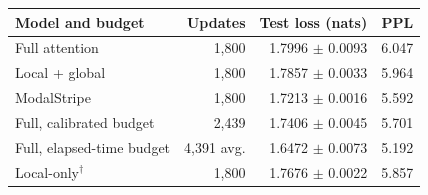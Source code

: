 \begin{tabular}{lrrr}\toprule
Model and budget & Updates & Test loss (nats) & PPL\\\midrule
Full attention & 1,800 & 1.7996 $\pm$ 0.0093 & 6.047 \\
Local + global & 1,800 & 1.7857 $\pm$ 0.0033 & 5.964 \\
ModalStripe & 1,800 & 1.7213 $\pm$ 0.0016 & 5.592 \\
Full, calibrated budget & 2,439 & 1.7406 $\pm$ 0.0045 & 5.701 \\
Full, elapsed-time budget & 4,391 avg. & 1.6472 $\pm$ 0.0073 & 5.192 \\
Local-only$^{\dagger}$ & 1,800 & 1.7676 $\pm$ 0.0022 & 5.857 \\
\bottomrule\end{tabular}
